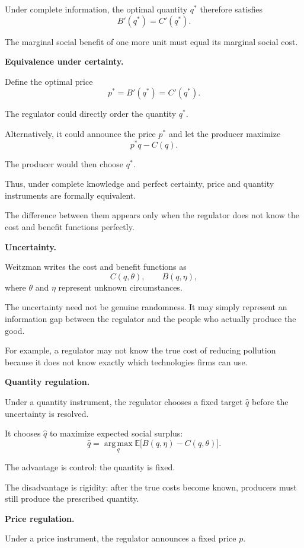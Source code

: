 Under complete information, the optimal
quantity $q^*$ therefore satisfies
\[
  B'(q^*)=C'(q^*).
\]

The marginal social benefit of one more
unit must equal its marginal social cost.

\medskip\noindent
{\bf Equivalence under certainty.}

Define the optimal price
\[
  p^*=B'(q^*)=C'(q^*).
\]

The regulator could directly order the
quantity $q^*$.

Alternatively, it could announce the price
$p^*$ and let the producer maximize
\[
  p^*q-C(q).
\]

The producer would then choose $q^*$.

Thus, under complete knowledge and perfect
certainty, price and quantity instruments
are formally equivalent.

The difference between them appears only
when the regulator does not know the cost
and benefit functions perfectly.

\medskip\noindent
{\bf Uncertainty.}

Weitzman writes the cost and benefit
functions as
\[
  C(q,\theta),
  \qquad
  B(q,\eta),
\]
where $\theta$ and $\eta$ represent
unknown circumstances.

The uncertainty need not be genuine
randomness. It may simply represent an
information gap between the regulator and
the people who actually produce the good.

For example, a regulator may not know the
true cost of reducing pollution because it
does not know exactly which technologies
firms can use.

\medskip\noindent
{\bf Quantity regulation.}

Under a quantity instrument, the regulator
chooses a fixed target $\widehat q$ before
the uncertainty is resolved.

It chooses $\widehat q$ to maximize
expected social surplus:
\[
  \widehat q
  =
  \operatorname*{arg\,max}_{q}
  \mathbb{E}
  \bigl[
    B(q,\eta)-C(q,\theta)
  \bigr].
\]

The advantage is control: the quantity is
fixed.

The disadvantage is rigidity: after the
true costs become known, producers must
still produce the prescribed quantity.

\medskip\noindent
{\bf Price regulation.}

Under a price instrument, the regulator
announces a fixed price $p$.


